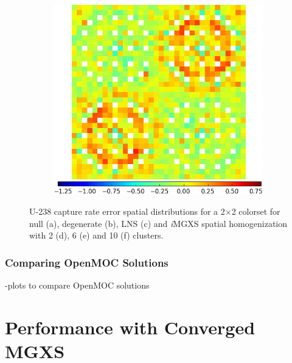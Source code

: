 \begin{figure}[h!]
\begin{subfigure}{0.45\textwidth}
  \caption{}
  \label{fig:chap11-assm-2x2-capt-pinch-6}
\end{subfigure}%
\begin{subfigure}{0.45\textwidth}
  \centering
  \includegraphics[width=\linewidth]{figures/results/2x2/ensemble-transform/capt-err-pinch-agglomerative-(10)}
  \caption{}
  \label{fig:chap11-assm-2x2-capt-pinch-10}
\end{subfigure}
\vspace{2mm}
\caption[U-238 capture rate errors for a 2$\times$2 colorset]{U-238 capture rate error spatial distributions for a 2$\times$2 colorset for null (a), degenerate (b), \ac{LNS} (c) and \textit{i}\ac{MGXS} spatial homogenization with 2 (d), 6 (e) and 10 (f) clusters.}
\label{fig:chap11-assm-2x2-capt-rates}
\end{figure}

\clearpage

\subsubsection{Comparing OpenMOC Solutions}
\label{subsec:chap11-imgxs-capt-rates-compare}

-plots to compare OpenMOC solutions


\section{Performance with Converged MGXS}
\label{sec:chap11-improvements}


